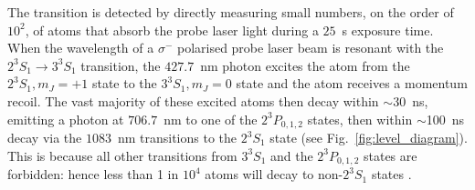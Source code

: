\documentclass[%
 reprint,
 amsmath,amssymb,
 aps,
 prl,
]{revtex4-2}
\newcommand{\brycerev}[1]{{\color{Purple}{#1}\normalcolor}} %
\newcommand{\brycecom}[1]{{\color{ProcessBlue}[{#1}]\normalcolor}} %
\newcommand{\UpperState}{3^{3\!}S_1}%
\newcommand{\MetastableState}{2^{3\!}S_1}%
\newcommand{\MidState}{2^{3\!}P_{0,1,2}}%
\newcommand{\GroundState}{1^{1\!}S_{0}}%
\begin{document}








The transition is detected by directly measuring small numbers, on the order of \(10^2\), of atoms that absorb the probe laser light during a \(25\)~s exposure time. 
When the wavelength of a \(\sigma^-\) polarised probe laser beam is resonant with the \(\MetastableState \rightarrow \UpperState\) transition, the \(427.7\)~nm photon excites the atom from the \(\MetastableState , m_J=+1\) state to the \(\UpperState , m_J=0\) state and the atom receives a momentum recoil. 
The vast majority of these excited atoms then decay within $\sim$30~ns, emitting a photon at \(706.7\)~nm to one of the \(\MidState\) states, then within $\sim$100~ns decay via the \(1083\)~nm transitions to the \(\MetastableState\) state (see Fig.~\ref{fig:level_diagram}). This is because all other transitions from \(\UpperState\) and the \(\MidState\) states are forbidden: hence less than 1 in \(10^4\) atoms will decay to non-\(\MetastableState\) states \cite{PhysRevLett.100.023001,Hodgman2009a}.
\end{document}
